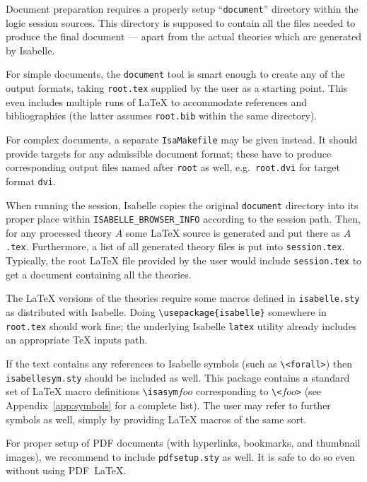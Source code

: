 \medskip Document preparation requires a properly setup ``\texttt{document}''
directory within the logic session sources.  This directory is supposed to
contain all the files needed to produce the final document --- apart from the
actual theories which are generated by Isabelle.

\medskip For simple documents, the \texttt{document} tool is smart enough to
create any of the output formats, taking \texttt{root.tex} supplied by the
user as a starting point.  This even includes multiple runs of {\LaTeX} to
accommodate references and bibliographies (the latter assumes
\texttt{root.bib} within the same directory).

For complex documents, a separate \texttt{IsaMakefile} may be given instead.
It should provide targets for any admissible document format; these have to
produce corresponding output files named after \texttt{root} as well, e.g.\ 
\texttt{root.dvi} for target format \texttt{dvi}.

\medskip When running the session, Isabelle copies the original
\texttt{document} directory into its proper place within
\texttt{ISABELLE_BROWSER_INFO} according to the session path.  Then, for any
processed theory $A$ some {\LaTeX} source is generated and put there as
$A$\texttt{.tex}.  Furthermore, a list of all generated theory files is put
into \texttt{session.tex}.  Typically, the root {\LaTeX} file provided by the
user would include \texttt{session.tex} to get a document containing all the
theories.

The {\LaTeX} versions of the theories require some macros defined in
\texttt{isabelle.sty} as distributed with Isabelle.  Doing
\verb,\usepackage{isabelle}, somewhere in \texttt{root.tex} should work fine;
the underlying Isabelle \texttt{latex} utility already includes an appropriate
{\TeX} inputs path.

If the text contains any references to Isabelle symbols (such as
\verb,\<forall>,) then \texttt{isabellesym.sty} should be included as well.
This package contains a standard set of {\LaTeX} macro definitions
\verb,\isasym,$foo$ corresponding to \verb,\<,$foo$\verb,>, (see
Appendix~\ref{app:symbols} for a complete list).  The user may refer to
further symbols as well, simply by providing {\LaTeX} macros of the same sort.

For proper setup of PDF documents (with hyperlinks, bookmarks, and thumbnail
images), we recommend to include \verb,pdfsetup.sty, as well.  It is safe to
do so even without using PDF~\LaTeX.

